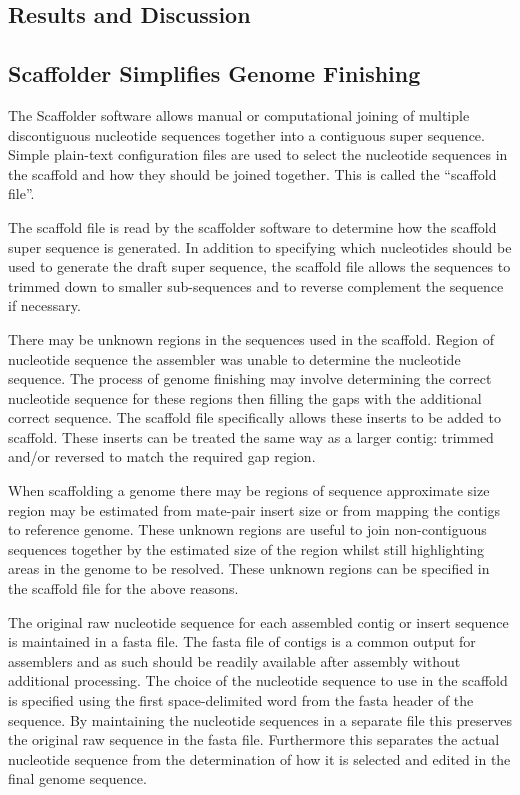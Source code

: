 \documentclass[10pt]{bmc_article}
\newenvironment{bmcformat}{\begin{raggedright}\baselineskip20pt\sloppy\setboolean{publ}{false}}{\end{raggedright}\baselineskip20pt\sloppy}
\begin{document}
\begin{bmcformat}
\clearpage

\section*{Results and Discussion} %

\subsection*{Scaffolder Simplifies Genome Finishing} %

The Scaffolder software allows manual or computational joining of multiple
discontiguous nucleotide sequences together into a contiguous super sequence.
Simple plain-text configuration files are used to select the nucleotide
sequences in the scaffold and how they should be joined together. This is
called the ``scaffold file''. \pb

The scaffold file is read by the scaffolder software to determine how the
scaffold super sequence is generated. In addition to specifying which
nucleotides should be used to generate the draft super sequence, the scaffold
file allows the sequences to trimmed down to smaller sub-sequences and to
reverse complement the sequence if necessary. \pb

There may be unknown regions in the sequences used in the scaffold. Region of
nucleotide sequence the assembler was unable to determine the nucleotide
sequence. The process of genome finishing may involve determining the correct
nucleotide sequence for these regions then filling the gaps with the additional
correct sequence. The scaffold file specifically allows these inserts to be
added to scaffold. These inserts can be treated the same way as a larger
contig: trimmed and/or reversed to match the required gap region. \pb

When scaffolding a genome there may be regions of sequence approximate size
region may be estimated from mate-pair insert size or from mapping the contigs
to reference genome. These unknown regions are useful to join non-contiguous
sequences together by the estimated size of the region whilst still
highlighting areas in the genome to be resolved. These unknown regions can be
specified in the scaffold file for the above reasons. \pb

The original raw nucleotide sequence for each assembled contig or insert
sequence is maintained in a fasta file. The fasta file of contigs is a common
output for assemblers and as such should be readily available after assembly
without additional processing. The choice of the nucleotide sequence to use in
the scaffold is specified using the first space-delimited word from the fasta
header of the sequence. By maintaining the nucleotide sequences in a separate
file this preserves the original raw sequence in the fasta file. Furthermore
this separates the actual nucleotide sequence from the determination of how it
is selected and edited in the final genome sequence. \pb


\end{bmcformat}
\end{document}
